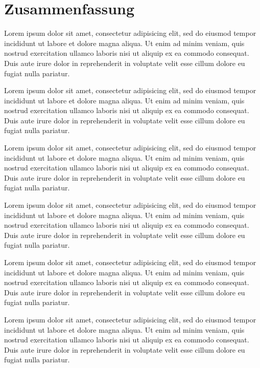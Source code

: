 \chapter*{Zusammenfassung}\label{chapter:zusammenfassung}
 Lorem ipsum dolor sit amet, consectetur adipisicing elit, sed do eiusmod
tempor incididunt ut labore et dolore magna aliqua. Ut enim ad minim veniam, quis
nostrud exercitation ullamco laboris nisi ut aliquip ex ea commodo consequat. Duis aute
irure dolor in reprehenderit in voluptate velit esse cillum dolore eu fugiat nulla pariatur.


 Lorem ipsum dolor sit amet, consectetur adipisicing elit, sed do eiusmod
tempor incididunt ut labore et dolore magna aliqua. Ut enim ad minim veniam, quis
nostrud exercitation ullamco laboris nisi ut aliquip ex ea commodo consequat. Duis aute
irure dolor in reprehenderit in voluptate velit esse cillum dolore eu fugiat nulla pariatur.


 Lorem ipsum dolor sit amet, consectetur adipisicing elit, sed do eiusmod
tempor incididunt ut labore et dolore magna aliqua. Ut enim ad minim veniam, quis
nostrud exercitation ullamco laboris nisi ut aliquip ex ea commodo consequat. Duis aute
irure dolor in reprehenderit in voluptate velit esse cillum dolore eu fugiat nulla pariatur.


 Lorem ipsum dolor sit amet, consectetur adipisicing elit, sed do eiusmod
tempor incididunt ut labore et dolore magna aliqua. Ut enim ad minim veniam, quis
nostrud exercitation ullamco laboris nisi ut aliquip ex ea commodo consequat. Duis aute
irure dolor in reprehenderit in voluptate velit esse cillum dolore eu fugiat nulla pariatur.


 Lorem ipsum dolor sit amet, consectetur adipisicing elit, sed do eiusmod
tempor incididunt ut labore et dolore magna aliqua. Ut enim ad minim veniam, quis
nostrud exercitation ullamco laboris nisi ut aliquip ex ea commodo consequat. Duis aute
irure dolor in reprehenderit in voluptate velit esse cillum dolore eu fugiat nulla pariatur.


 Lorem ipsum dolor sit amet, consectetur adipisicing elit, sed do eiusmod
tempor incididunt ut labore et dolore magna aliqua. Ut enim ad minim veniam, quis
nostrud exercitation ullamco laboris nisi ut aliquip ex ea commodo consequat. Duis aute
irure dolor in reprehenderit in voluptate velit esse cillum dolore eu fugiat nulla pariatur.
